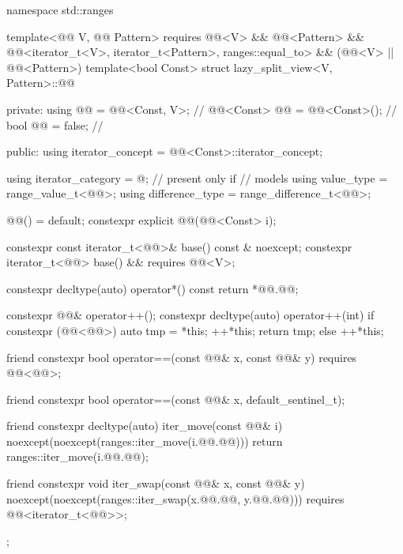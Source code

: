 %
\begin{codeblock}
namespace std::ranges {
  template<@@ V, @@ Pattern>
    requires @@<V> && @@<Pattern> &&
             @@<iterator_t<V>, iterator_t<Pattern>, ranges::equal_to> &&
             (@@<V> || @@<Pattern>)
  template<bool Const>
  struct lazy_split_view<V, Pattern>::@@ {
  private:
    using @@ = @@<Const, V>;                     // \expos
    @@<Const> @@ = @@<Const>();     // \expos
    bool @@ = false;                              // \expos

  public:
    using iterator_concept  = @@<Const>::iterator_concept;

    using iterator_category = @\seebelownc@;                    // present only if 
                                                            // models 
    using value_type        = range_value_t<@@>;
    using difference_type   = range_difference_t<@@>;

    @@() = default;
    constexpr explicit @@(@@<Const> i);

    constexpr const iterator_t<@@>& base() const & noexcept;
    constexpr iterator_t<@@> base() && requires @@<V>;

    constexpr decltype(auto) operator*() const { return *@@.@@; }

    constexpr @@& operator++();
    constexpr decltype(auto) operator++(int) {
      if constexpr (@@<@@>) {
        auto tmp = *this;
        ++*this;
        return tmp;
      } else
        ++*this;
    }

    friend constexpr bool operator==(const @@& x, const @@& y)
      requires @@<@@>;

    friend constexpr bool operator==(const @@& x, default_sentinel_t);

    friend constexpr decltype(auto) iter_move(const @@& i)
    noexcept(noexcept(ranges::iter_move(i.@@.@@))) {
      return ranges::iter_move(i.@@.@@);
    }

    friend constexpr void iter_swap(const @@& x, const @@& y)
      noexcept(noexcept(ranges::iter_swap(x.@@.@@, y.@@.@@)))
      requires @@<iterator_t<@@>>;
  };
}
\end{codeblock}

